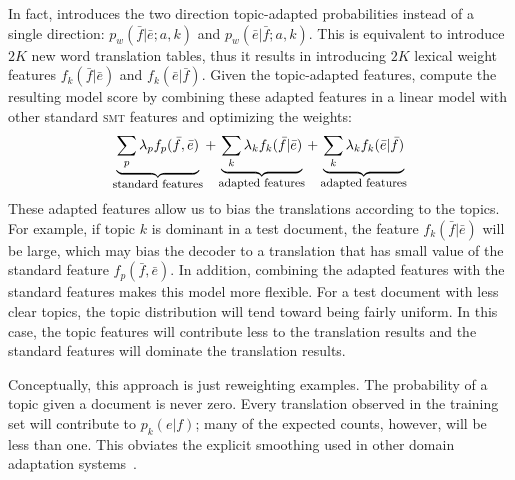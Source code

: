 In fact, \citet{Eidelman-12} introduces the two direction topic-adapted probabilities instead of a single direction: $p_w(\bar{f} | \bar{e};a, k)$ and $p_w(\bar{e} | \bar{f};a, k)$. This is equivalent to introduce $2K$ new word translation tables, thus it results in introducing $2K$ lexical weight features $f_{k}(\bar{f}|\bar{e})$ and $f_{k}(\bar{e}|\bar{f})$. Given the topic-adapted features, \citet{Eidelman-12} compute the resulting model score by combining these adapted features in a linear model with other standard \textsc{smt} features and optimizing the weights:
\begin{align}
\explain{standard features}{\sum_p \lambda_p f_p(\bar{f},\bar{e})} + \explain{adapted features}{\sum_k \lambda_k f_k(\bar{f} | \bar{e})} + \explain{adapted features}{\sum_k \lambda_k f_k(\bar{e} | \bar{f})}
\end{align}
These adapted features allow us to bias the translations according to the topics. For example, if topic $k$ is dominant in a test document, the feature $f_k(\bar{f} | \bar{e})$ will be large, which may bias the decoder to a translation that has small value of the standard feature $f_p(\bar{f}, \bar{e})$. In addition, combining the adapted features with the standard features makes this model more flexible. For a test document with less clear topics, the topic distribution will tend toward being fairly uniform. In this case, the topic features will contribute less to the translation results and the standard features will dominate the translation results.

Conceptually, this approach is just reweighting examples.  The probability of a topic given a document is never zero.  Every translation observed in the training set will contribute to $p_{k}(e|f)$; many of the expected counts, however, will be less than one.  This obviates the explicit smoothing used in other domain adaptation systems~\citep{chiang-11}.

